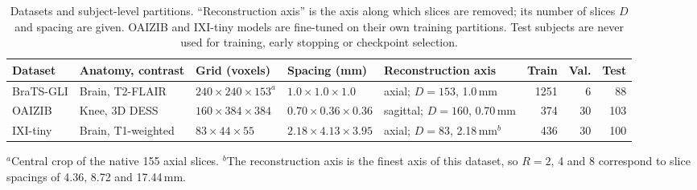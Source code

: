 \begin{table}[pos=t]
\caption{Datasets and subject-level partitions. ``Reconstruction axis'' is the axis along
which slices are removed; its number of slices $D$ and spacing are given. OAIZIB and
IXI-tiny models are fine-tuned on their own training partitions. Test subjects are never
used for training, early stopping or checkpoint selection.}
\label{tab:datasets}
\small
\begin{tabular*}{\textwidth}{@{\extracolsep{\fill}}lllllrrr@{}}
\toprule
Dataset & Anatomy, contrast & Grid (voxels) & Spacing (mm) & Reconstruction axis & Train & Val. & Test \\
\midrule
BraTS-GLI & Brain, T2-FLAIR & $240\times240\times153^{a}$ & $1.0\times1.0\times1.0$ & axial; $D=153$, 1.0\,mm & 1251 & 6 & 88 \\
OAIZIB & Knee, 3D DESS & $160\times384\times384$ & $0.70\times0.36\times0.36$ & sagittal; $D=160$, 0.70\,mm & 374 & 30 & 103 \\
IXI-tiny & Brain, T1-weighted & $83\times44\times55$ & $2.18\times4.13\times3.95$ & axial; $D=83$, 2.18\,mm$^{b}$ & 436 & 30 & 100 \\
\bottomrule
\end{tabular*}
\par\smallskip
{\footnotesize $^{a}$Central crop of the native 155 axial slices. $^{b}$The reconstruction
axis is the finest axis of this dataset, so $R=2$, 4 and 8 correspond to slice spacings of
4.36, 8.72 and 17.44\,mm.}
\end{table}

